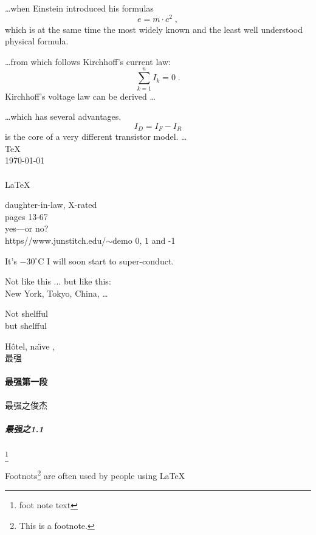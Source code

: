 \documentclass[a4paper, 11pt]{article}
\begin{document}
\ldots when Einstein introduced his formulas
\begin{equation}
e = m \cdot c^2 \; ,
\end{equation}
which is at the same time the most widely known
and the least well understood physical formula.


\ldots from which follows Kirchhoff’s current law:
\begin{equation}
\sum_{k=1}^{n} I_k = 0 \; .
\end{equation}
Kirchhoff’s  voltage law can be derived \ldots

\sloppy

\newpage

\ldots which has several advantages.
\begin{equation}
I_D = I_F - I_R
\end{equation}
is the core of a very different transistor model. \ldots
\\
\TeX \\ \today \\ \LaTeXe \\
\LaTeX

daughter-in-law, X-rated\\
pages 13-67\\
yes---or no? \\
https//www.junstitch.edu/$\sim$demo
$0$, $1$ and -1

It's $-30 ^{\circ}\mathrm{C}$
I will soon start to super-conduct.

Not like this ... but like this:\\ New York, Tokyo, China, \ldots

Not shelfful \\ but shelf\mbox{}ful

H\^otel, na\"\i ve ,\\最强
\paragraph{最强第一段}
最强之俊杰
\subparagraph{最强之1.1}

\footnote{foot note text}

Footnots\footnote{This is a footnote.} are often used by people using \LaTeX
\end{document}
